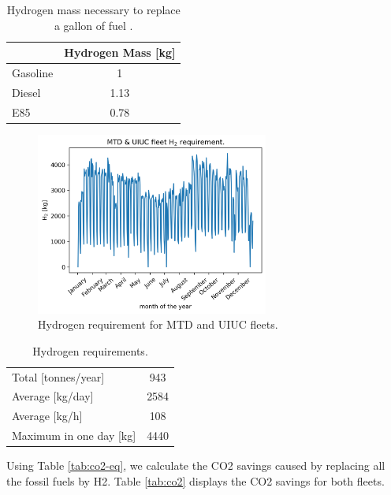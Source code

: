 \documentclass[11pt,letterpaper]{article}
\begin{document}
	\begin{table}[htbp!]
	\centering
	\caption{Hydrogen mass necessary to replace a gallon of fuel \cite{doe_office_of_energy_efficiency_and_renewable_energy_hydrogen_2020} \cite{alternative_fuels_data_center_fuel_2014}.}
	\begin{tabular}{|l|c|}
	    \hline
	 	                 & Hydrogen Mass [kg] \\ \hline
	 	Gasoline         & 1                  \\
	 	Diesel           & 1.13               \\
	 	E85              & 0.78               \\ \hline
	\end{tabular}
	\label{tab:equiv}
	\end{table}

	\begin{figure}[htbp!]
	    \centering
		\includegraphics[height=6.0cm]{figures/hydro-fleet}
		\hfill
		\caption{Hydrogen requirement for MTD and UIUC fleets.}
		\label{fig:hydro-fleet}
	\end{figure}

	\begin{table}[htbp!]
		\centering
	    \caption{Hydrogen requirements.}
		\begin{tabular}{|l|c|}
		\hline
		Total [tonnes/year]     & 943    \\
		Average [kg/day] 	    & 2584   \\
		Average [kg/h] 		    & 108    \\
		Maximum in one day [kg] & 4440   \\ \hline
        \end{tabular}
        \label{tab:hydro-fleet}
	\end{table}

Using Table \ref{tab:co2-eq}, we calculate the \gls{CO2} savings caused by replacing all the fossil fuels by \gls{H2}.
Table \ref{tab:co2} displays the \gls{CO2} savings for both fleets.
\end{document}
